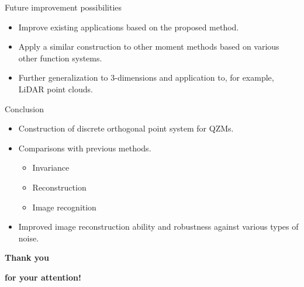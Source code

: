 \documentclass{beamer}
\begin{document}
\begin{frame}{Future improvement possibilities}
    \begin{itemize}
    \item Improve existing applications based on the proposed method.
    \item Apply a similar construction to other moment methods based on various other function systems.
    \item Further generalization to 3-dimensions and application to, for example, LiDAR point clouds.
    \end{itemize}
\end{frame}

\begin{frame}{Conclusion}
    \begin{itemize}
    \item Construction of discrete orthogonal point system for QZMs.
    \item Comparisons with previous methods.
        \begin{itemize}
        \item Invariance
        \item Reconstruction
        \item Image recognition
        \end{itemize}
    \item Improved image reconstruction ability and robustness against various types of noise.
    \end{itemize}
\end{frame}


{
%
\begin{frame}{}

\textbf{\huge\color{white} Thank you}

\bigskip

\textbf{\huge\color{white} for your attention!}

\end{frame}
}
\end{document}
